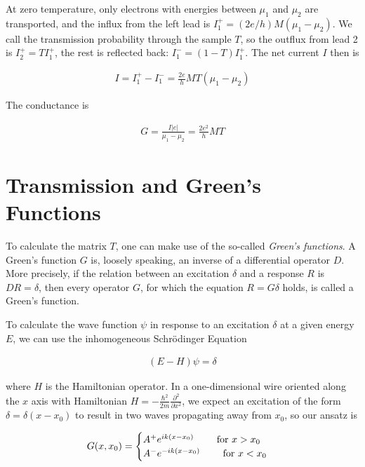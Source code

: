 \documentclass[11pt,twoside]{book}
\begin{document}
At zero temperature, only electrons with energies between $\mu_1$ and $\mu_2$
are transported, and the influx from the left lead is
$I_1^+ = (2e/h)M(\mu_1-\mu_2)$. We call the transmission probability through
the sample $T$, so the outflux from lead 2 is $I_2^+ = T I_1^+$, the rest
is reflected back: $I_1^- = (1-T) I_1^+$. The net current $I$ then is

\begin{align}
    I = I_1^+ - I_1^- = \frac{2e}{h} M T (\mu_1 - \mu_2)
\end{align}

The conductance is

\begin{align}
    G = \frac{I |e|}{\mu_1 - \mu_2} = \frac{2 e^2}{h} MT
\end{align}

\section{Transmission and Green's Functions}

To calculate the matrix $T$, one can make use of the so-called \emph{Green's
functions}. A Green's function $G$ is, loosely speaking, an inverse of a
differential operator $D$. More precisely, if the relation between an
excitation $\delta$ and a response $R$ is $D R = \delta$, then every
operator $G$, for
which the equation $R = G \delta$ holds, is called a Green's function.

To calculate the wave function $\psi$ in response to an excitation $\delta$ at a
given energy $E$, we can use the inhomogeneous Schrödinger Equation

\begin{align}
    \label{eq:green-define}
    (E - H) \psi = \delta
\end{align}

where $H$ is the Hamiltonian operator. In a one-dimensional wire oriented
along the $x$ axis with Hamiltonian $H =
-\frac{\hbar^2}{2m}\frac{\partial^2}{\partial x^2}$, we expect an excitation of the form
$\delta = \delta(x - x_0)$ to result in two waves propagating away from $x_0$,
so our ansatz is

\begin{align}
    G(x, x_0) = \begin{cases}
        A^+ e^{i k(x-x_0) } \qquad \textnormal{ for } x > x_0 \\
        A^- e^{-i k(x-x_0) } \qquad \textnormal{ for } x < x_0 \\
    \end{cases}
\end{align}
\end{document}
